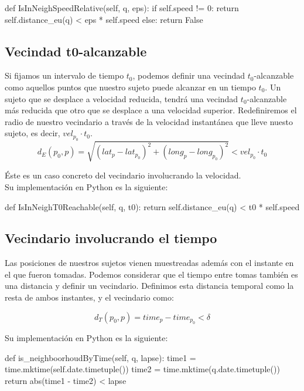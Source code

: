 \documentclass[a4paper, 12pt]{article}
\begin{document}
\begin{python}
        def IsInNeighSpeedRelative(self, q, eps):
			if self.speed != 0:
				return self.distance_eu(q) < eps * self.speed	
			else:
				return False
\end{python}


\subsection{Vecindad t0-alcanzable}

Si fijamos un intervalo de tiempo $t_0$, podemos definir una vecindad $t_0$-alcanzable como aquellos puntos que nuestro sujeto puede alcanzar en un tiempo $t_0$. Un sujeto que se desplace a velocidad reducida, tendr\'a una vecindad $t_0$-alcanzable m\'as reducida que otro que se desplace a una velocidad superior. Redefiniremos el radio de nuestro vecindario a trav\'es de la velocidad instant\'anea que lleve nuesto sujeto, es decir, $vel_{p_0}\cdot t_0$.  \\

$$ d_E(p_0, p) = \sqrt{(lat_{p} - lat_{p_0})^2 + (long_{p} - long_{p_0})^2 } < vel_{p_0} \cdot t_0 $$

\'Este es un caso concreto del vecindario involucrando la velocidad. \\


Su implementaci\'on en Python es la siguiente:\\

\begin{python}
        def IsInNeighT0Reachable(self, q, t0):
                return self.distance_eu(q) < t0 * self.speed
\end{python}

\subsection{Vecindario involucrando el tiempo}

Las posiciones de nuestros sujetos vienen muestreadas adem\'as con el instante en el que fueron tomadas. Podemos considerar que el tiempo entre tomas tambi\'en es una distancia y definir un vecindario. Definimos esta distancia temporal como la resta de ambos instantes, y el vecindario como: 

$$ d_T(p_0, p) = time_p - time_{p_0} < \delta $$

Su implementaci\'on en Python es la siguiente:\\

\begin{python}
	def is_neighboorhoudByTime(self, q, lapse):
		time1 = time.mktime(self.date.timetuple())
		time2 = time.mktime(q.date.timetuple())
		return abs(time1 - time2) < lapse
\end{python}
\end{document}
